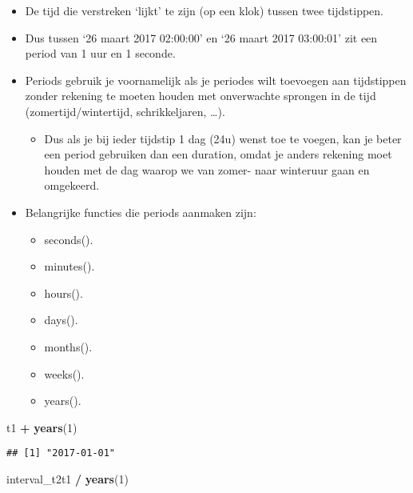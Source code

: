 \documentclass[]{memoir}
\newenvironment{Shaded}{\begin{snugshade}}{\end{snugshade}}
\newcommand{\KeywordTok}[1]{\textcolor[rgb]{0.13,0.29,0.53}{\textbf{#1}}}
\newcommand{\DecValTok}[1]{\textcolor[rgb]{0.00,0.00,0.81}{#1}}
\newcommand{\StringTok}[1]{\textcolor[rgb]{0.31,0.60,0.02}{#1}}
\newcommand{\OperatorTok}[1]{\textcolor[rgb]{0.81,0.36,0.00}{\textbf{#1}}}
\newcommand{\NormalTok}[1]{#1}
\providecommand{\tightlist}{%
  \setlength{\itemsep}{0pt}\setlength{\parskip}{0pt}}
\begin{document}
\begin{itemize}
\tightlist
\item
  De tijd die verstreken `lijkt' te zijn (op een klok) tussen twee
  tijdstippen.
\item
  Dus tussen `26 maart 2017 02:00:00' en `26 maart 2017 03:00:01' zit
  een period van 1 uur en 1 seconde.
\item
  Periods gebruik je voornamelijk als je periodes wilt toevoegen aan
  tijdstippen zonder rekening te moeten houden met onverwachte sprongen
  in de tijd (zomertijd/wintertijd, schrikkeljaren, \ldots{}).

  \begin{itemize}
  \tightlist
  \item
    Dus als je bij ieder tijdstip 1 dag (24u) wenst toe te voegen, kan
    je beter een period gebruiken dan een duration, omdat je anders
    rekening moet houden met de dag waarop we van zomer- naar winteruur
    gaan en omgekeerd.
  \end{itemize}
\item
  Belangrijke functies die periods aanmaken zijn:

  \begin{itemize}
  \tightlist
  \item
    seconds().
  \item
    minutes().
  \item
    hours().
  \item
    days().
  \item
    months().
  \item
    weeks().
  \item
    years().
  \end{itemize}
\end{itemize}

\begin{Shaded}
\begin{Highlighting}[]
\NormalTok{t1 }\OperatorTok{+}\StringTok{ }\KeywordTok{years}\NormalTok{(}\DecValTok{1}\NormalTok{)}
\end{Highlighting}
\end{Shaded}

\begin{verbatim}
## [1] "2017-01-01"
\end{verbatim}

\begin{Shaded}
\begin{Highlighting}[]
\NormalTok{interval_t2t1 }\OperatorTok{/}\StringTok{ }\KeywordTok{years}\NormalTok{(}\DecValTok{1}\NormalTok{)}
\end{Highlighting}
\end{Shaded}
\end{document}
